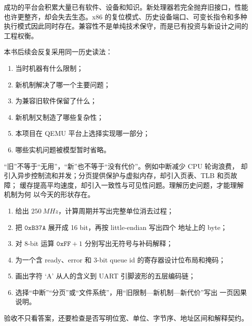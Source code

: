 成功的平台会积累大量已有软件、设备和知识。新处理器若完全抛弃旧接口，性能
也许更整齐，却会失去生态。x86 的复位模式、历史设备端口、可变长指令和多种
执行模式因此同时存在。兼容性不是单纯技术保守，而是已有投资与新设计之间的
工程权衡。

本书后续会反复采用同一历史读法：

\begin{enumerate}[leftmargin=2.2em]
  \item 当时机器有什么限制；
  \item 新机制解决了哪一个主要问题；
  \item 为兼容旧软件保留了什么；
  \item 新机制又制造了哪些复杂性；
  \item 本项目在 QEMU 平台上选择实现哪一部分；
  \item 哪些实机问题被模型暂时省略。
\end{enumerate}

\begin{historybox}
“旧”不等于“无用”，“新”也不等于“没有代价”。例如中断减少 CPU 轮询浪费，
却引入异步控制流和并发；分页提供保护与虚拟内存，却引入页表、TLB 和页故障；
缓存提高平均速度，却引入一致性与可见性问题。理解历史问题，才能理解机制为何
以今天的形状存在。
\end{historybox}

\begin{enumerate}[leftmargin=2.2em]
  \item 给出 \(\SI{250}{MHz}\)，计算周期并写出完整单位消去过程；
  \item 把 \(\texttt{0xB37A}\) 展开成 16 bit，再按 little-endian 写出四个
        地址上的 byte；
  \item 对 8-bit 运算 \(\texttt{0xFF}+1\) 分别写出无符号与补码解释；
  \item 为一个含 ready、error 和 3-bit queue id 的寄存器设计位布局和掩码；
  \item 画出字符 `A' 从人的含义到 UART 引脚波形的五层编码链；
  \item 选择“中断”“分页”或“文件系统”，用“旧限制—新机制—新代价”写出
        一页因果说明。
\end{enumerate}

验收不只看答案，还要检查是否写明位宽、单位、字节序、地址区间和解释契约。

